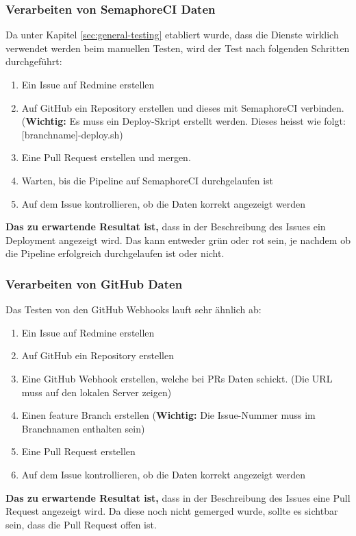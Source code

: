 \subsubsection{Verarbeiten von SemaphoreCI Daten}
Da unter Kapitel \ref{sec:general-testing} etabliert wurde, dass die Dienste wirklich verwendet werden beim manuellen Testen,
wird der Test nach folgenden Schritten durchgeführt:
\begin{enumerate}
  \item Ein Issue auf Redmine erstellen
  \item Auf GitHub ein Repository erstellen und dieses mit SemaphoreCI verbinden. 
  (\textbf{Wichtig:} Es muss ein Deploy-Skript erstellt werden. Dieses heisst wie folgt:
  [branchname]-deploy.sh)
  \item Eine Pull Request erstellen und mergen.
  \item Warten, bis die Pipeline auf SemaphoreCI durchgelaufen ist
  \item Auf dem Issue kontrollieren, ob die Daten korrekt angezeigt werden
\end{enumerate}

\textbf{Das zu erwartende Resultat ist,} dass in der Beschreibung des Issues ein Deployment angezeigt wird. Das kann entweder grün oder rot
sein, je nachdem ob die Pipeline erfolgreich durchgelaufen ist oder nicht.

\subsubsection{Verarbeiten von GitHub Daten}
\label{sec:github-testing}
Das Testen von den GitHub Webhooks lauft sehr ähnlich ab:
\begin{enumerate}
  \item Ein Issue auf Redmine erstellen
  \item Auf GitHub ein Repository erstellen
  \item Eine GitHub Webhook erstellen, welche bei PRs Daten schickt. (Die URL muss auf den lokalen Server zeigen)
  \item Einen feature Branch erstellen (\textbf{Wichtig:} Die Issue-Nummer muss im Branchnamen enthalten sein)
  \item Eine Pull Request erstellen
  \item Auf dem Issue kontrollieren, ob die Daten korrekt angezeigt werden
\end{enumerate}

\textbf{Das zu erwartende Resultat ist,} dass in der Beschreibung des Issues eine Pull Request angezeigt wird. Da diese noch nicht gemerged
wurde, sollte es sichtbar sein, dass die Pull Request offen ist.

